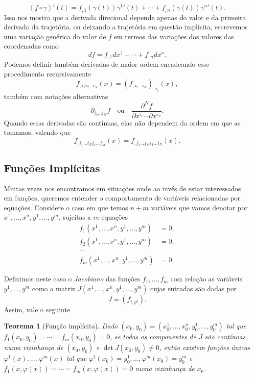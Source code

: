 \documentclass[a4paper, 12pt]{article}
\newtheorem{theorem}{Teorema}[section]
\theoremstyle{definition}
\theoremstyle{definition}
\begin{document}
$$(f\circ\gamma)'(t)=f_{,1}(\gamma(t))\gamma^{1}{'}(t)+\cdots+f_{,n}(\gamma(t))\gamma^{n}{'}(t).$$
Isso nos mostra que a derivada direcional depende apenas do valor e da primeira derivada da trajetória.
ou deixando a trajetória em questão implícita, escrevemos uma variação genérica do valor de $f$ em termos
das variações dos valores das coordenadas como
$$df=f_{,1}dx^1+\cdots+f_{,n}dx^n.$$
Podemos definir também derivadas de maior ordem encadeando esse procedimento recursivamente
$$f_{,i_1i_2\dots i_N}(x)=(f_{,i_2\dots i_N})_{,i_1}(x),$$
também com notações alternativas
$$\partial_{i_1\dots i_N} f\quad\text{ou}\quad\frac{\partial^N f}{\partial x^{i_1}\cdots\partial x^{i_N}}.$$
Quando essas derivadas são contínuas, elas não dependem da ordem em que as tomamos, valendo que
$$f_{,i_1\dots i_Nj_1\dots j_M}(x)=f_{,j_1\dots j_Mi_1\dots i_N}(x).$$

\subsection{Funções Implícitas}

Muitas vezes nos encontramos em situações onde ao invés de estar interessados em funções, queremos entender
o comportamento de variáveis relacionadas por equações. Considere o caso em que temos $n+m$ variáveis
que vamos denotar por $x^1,\dots,x^n,y^1,\dots,y^m$, sujeitas a $m$ equações
\begin{align*}
    f_1(x^1,\dots,x^n,y^1,\dots,y^m)&=0,\\
    f_2(x^1,\dots,x^n,y^1,\dots,y^m)&=0,\\
    \cdots&\\
    f_m(x^1,\dots,x^n,y^1,\dots,y^m)&=0.
\end{align*}

Definimos neste caso o \textit{Jacobiano} das funções $f_1,\dots,f_m$ com relação as variáveis $y^1,\dots,y^m$
como a matriz $J(x^1,\dots,x^n,y^1,\dots,y^m)$ cujas entradas são dadas por
$$J=\left(f_{i,y^j}\right).$$
Assim, vale o seguinte 
\begin{theorem}[Função implícita]
    Dado $(x_0,y_0)=(x^1_0,\dots,x^n_0,y^1_0,\dots,y^m_0)$ tal que $f_1(x_0,y_0)=\cdots=f_m(x_0,y_0)=0$,
    se todas as componentes de $J$ são contínuas numa vizinhança de $(x_0,y_0)$ e $\det J(x_0,y_0)\neq0$,
    então existem funções únicas $\varphi^1(x),\dots,\varphi^m(x)$ tal que $\varphi^1(x_0)=y^1_0,\dots,
    \varphi^m(x_0)=y^m_0$ e $f_1(x,\varphi(x))=\cdots=f_m(x,\varphi(x))=0$ numa vizinhança de $x_0$.
\end{theorem}
\end{document}
